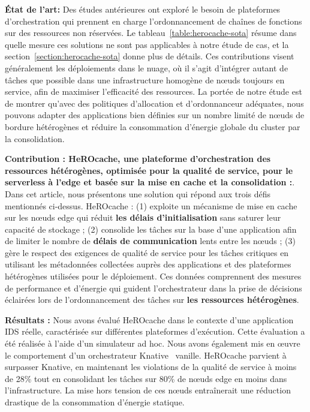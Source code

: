 \textbf{État de l'art:} Des études antérieures ont exploré le besoin de plateformes d'orchestration qui prennent en charge l'ordonnancement de chaînes de fonctions sur des ressources non réservées. Le tableau~\ref{table:herocache-sota} résume dans quelle mesure ces solutions ne sont pas applicables à notre étude de cas, et la section~\ref{section:herocache-sota} donne plus de détails. Ces contributions visent généralement les déploiements dans le nuage, où il s'agit d'intégrer autant de tâches que possible dans une infrastructure homogène de nœuds toujours en service, afin de maximiser l'efficacité des ressources. La portée de notre étude est de montrer qu'avec des politiques d'allocation et d'ordonnanceur adéquates, nous pouvons adapter des applications bien définies sur un nombre limité de nœuds de bordure hétérogènes et réduire la consommation d'énergie globale du cluster par la consolidation.

\textbf{Contribution : HeROcache, une plateforme d'orchestration des ressources hétérogènes, optimisée pour la qualité de service, pour le serverless à l'edge et basée sur la mise en cache et la consolidation :}. 
Dans cet article, nous présentons une solution qui répond aux trois défis mentionnés ci-dessus. HeROcache : (1) exploite un mécanisme de mise en cache sur les nœuds edge qui réduit \textbf{les délais d'initialisation} sans saturer leur capacité de stockage ;
(2) consolide les tâches sur la base d'une application afin de limiter le nombre de \textbf{délais de communication} lents entre les nœuds ;
(3) gère le respect des exigences de qualité de service pour les tâches critiques en utilisant les métadonnées collectées auprès des applications et des plateformes hétérogènes utilisées pour le déploiement. Ces données comprennent des mesures de performance et d'énergie qui guident l'orchestrateur dans la prise de décisions éclairées lors de l'ordonnancement des tâches sur \textbf{les ressources hétérogènes}.

\textbf{Résultats :} Nous avons évalué HeROcache dans le contexte d'une application IDS réelle, caractérisée sur différentes plateformes d'exécution. Cette évaluation a été réalisée à l'aide d'un simulateur ad hoc. Nous avons également mis en œuvre le comportement d'un orchestrateur Knative~\cite{knative} vanille. HeROcache parvient à surpasser Knative, en maintenant les violations de la qualité de service à moins de 28\% tout en consolidant les tâches sur 80\% de nœuds edge en moins dans l'infrastructure. La mise hors tension de ces nœuds entraînerait une réduction drastique de la consommation d'énergie statique.

